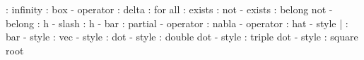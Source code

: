 \infty : infinity
\box : box - operator
\triangle : delta
\forall : for all
\exists : exists 
\nexists : not - exists
\in : belong 
\notin not - belong 
\hslash : h - slash
\hbar : h - bar
\partial : partial - operator
\nabla : nabla - operator
\hat{} : hat - style
\bar{} : bar - style
\vec{} : vec - style
\dot{} : dot - style
\ddot{} : double dot - style
\dddot{} : triple dot - style
\sqrt{} : square root
